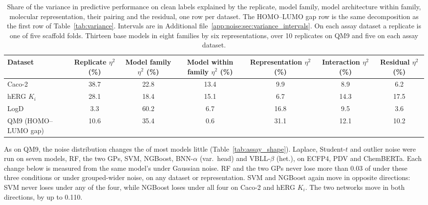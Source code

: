 \begin{table}[!htbp]
\centering
\small
\begin{adjustbox}{max width=\textwidth,max totalheight=0.78\textheight}
\begin{tabular}{lcccccc}
\toprule
Dataset & Replicate $\eta^2$ (\%) & Model family $\eta^2$ (\%) & Model within family $\eta^2$ (\%) & Representation $\eta^2$ (\%) & Interaction $\eta^2$ (\%) & Residual $\eta^2$ (\%) \\
\midrule
Caco-2 & 38.7 & 22.8 & 13.4 & 9.9 & 8.9 & 6.2 \\
hERG $K_i$ & 28.1 & 18.4 & 15.1 & 6.7 & 14.3 & 17.5 \\
LogD & 3.3 & 60.2 & 6.7 & 16.8 & 9.5 & 3.6 \\
QM9 (HOMO--LUMO gap) & 10.6 & 35.4 & 0.6 & 31.1 & 12.1 & 10.2 \\
\bottomrule
\end{tabular}
\end{adjustbox}
\caption[Variance decomposition of clean predictive performance by dataset.]{Share of the variance in predictive performance on clean labels explained by the replicate, model family, model architecture within family, molecular representation, their pairing and the residual, one row per dataset. The HOMO--LUMO gap row is the same decomposition as the first row of Table~\ref{tab:variance}. Intervals are in Additional file~\ref{app:noise:sec:variance_intervals}. On each assay dataset a replicate is one of five scaffold folds. Thirteen base models in eight families by six representations, over 10 replicates on QM9 and five on each assay dataset.}
\label{tab:variance_clean}
\end{table}

As on QM9, the noise distribution changes the \aucnorm{} of most models little (Table~\ref{tab:assay_shape}). Laplace, Student-$t$ and outlier noise were run on seven models, RF, the two GPs, SVM, NGBoost, BNN-$\alpha$ (var.\ head) and VBLL-$\beta$ (het.), on ECFP4, PDV and ChemBERTa. Each change below is measured from the same model's \aucnorm{} under Gaussian noise. RF and the two GPs never lose more than 0.03 of \aucnorm{} under these three conditions or under grouped-wider noise, on any dataset or representation. SVM and NGBoost again move in opposite directions: SVM never loses \aucnorm{} under any of the four, while NGBoost loses under all four on Caco-2 and hERG $K_i$. The two networks move in both directions, by up to 0.110.

